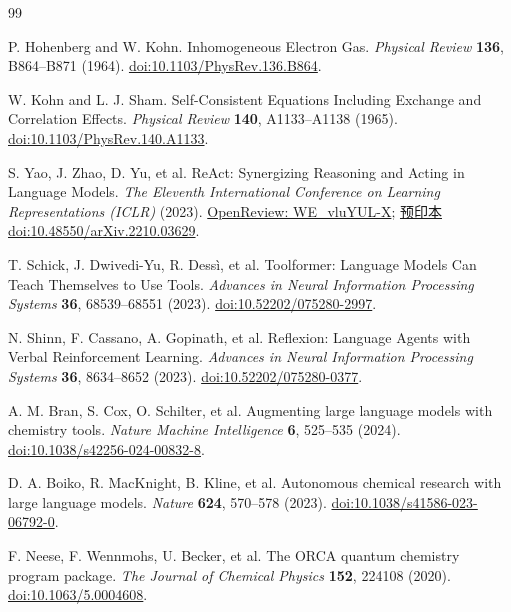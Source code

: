 \begin{thebibliography}{99}
\setlength{\itemsep}{0.25em}

P. Hohenberg and W. Kohn.
Inhomogeneous Electron Gas.
\emph{Physical Review} \textbf{136}, B864--B871 (1964).
\href{https://doi.org/10.1103/PhysRev.136.B864}{doi:10.1103/PhysRev.136.B864}.

W. Kohn and L. J. Sham.
Self-Consistent Equations Including Exchange and Correlation Effects.
\emph{Physical Review} \textbf{140}, A1133--A1138 (1965).
\href{https://doi.org/10.1103/PhysRev.140.A1133}{doi:10.1103/PhysRev.140.A1133}.

S. Yao, J. Zhao, D. Yu, et al.
ReAct: Synergizing Reasoning and Acting in Language Models.
\emph{The Eleventh International Conference on Learning Representations (ICLR)} (2023).
\href{https://openreview.net/forum?id=WE_vluYUL-X}{OpenReview: WE\_vluYUL-X};
\href{https://doi.org/10.48550/arXiv.2210.03629}{预印本 doi:10.48550/arXiv.2210.03629}.

T. Schick, J. Dwivedi-Yu, R. Dessì, et al.
Toolformer: Language Models Can Teach Themselves to Use Tools.
\emph{Advances in Neural Information Processing Systems} \textbf{36}, 68539--68551 (2023).
\href{https://doi.org/10.52202/075280-2997}{doi:10.52202/075280-2997}.

N. Shinn, F. Cassano, A. Gopinath, et al.
Reflexion: Language Agents with Verbal Reinforcement Learning.
\emph{Advances in Neural Information Processing Systems} \textbf{36}, 8634--8652 (2023).
\href{https://doi.org/10.52202/075280-0377}{doi:10.52202/075280-0377}.

A. M. Bran, S. Cox, O. Schilter, et al.
Augmenting large language models with chemistry tools.
\emph{Nature Machine Intelligence} \textbf{6}, 525--535 (2024).
\href{https://doi.org/10.1038/s42256-024-00832-8}{doi:10.1038/s42256-024-00832-8}.

D. A. Boiko, R. MacKnight, B. Kline, et al.
Autonomous chemical research with large language models.
\emph{Nature} \textbf{624}, 570--578 (2023).
\href{https://doi.org/10.1038/s41586-023-06792-0}{doi:10.1038/s41586-023-06792-0}.

F. Neese, F. Wennmohs, U. Becker, et al.
The ORCA quantum chemistry program package.
\emph{The Journal of Chemical Physics} \textbf{152}, 224108 (2020).
\href{https://doi.org/10.1063/5.0004608}{doi:10.1063/5.0004608}.


\end{thebibliography}
